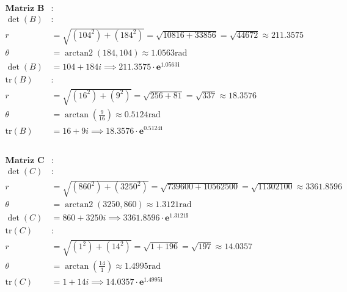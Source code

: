 \documentclass[11pt]{article}
\begin{document}
    $\displaystyle 
    \begin{aligned}
    \mathbf{\text{Matriz } B} &: \\
    \det(B) &: \\
    r &= \sqrt{(104^2) + (184^2)} = \sqrt{10816 + 33856} = \sqrt{44672} \approx 211.3575 \\
    \theta &= \operatorname{arctan2}(184,104) \approx 1.0563 \text{rad} \\
    \det(B) &= 104 + 184i \implies \mathbf{211.3575 \cdot e^{1.0563i}} \\
    \text{tr}(B) &: \\
    r &= \sqrt{(16^2) + (9^2)} = \sqrt{256 + 81} = \sqrt{337} \approx 18.3576 \\
    \theta &= \operatorname{arctan}\left(\frac{9}{16}\right) \approx 0.5124 \text{rad} \\
    \text{tr}(B) &= 16 + 9i \implies \mathbf{18.3576 \cdot e^{0.5124i}}
    \end{aligned}
    $

    
    \begin{Verbatim}[commandchars=\\\{\}]

    \end{Verbatim}

    $\displaystyle 
    \begin{aligned}
    \mathbf{\text{Matriz } C} &: \\
    \det(C) &: \\
    r &= \sqrt{(860^2) + (3250^2)} = \sqrt{739600 + 10562500} = \sqrt{11302100} \approx 3361.8596 \\
    \theta &= \operatorname{arctan2}(3250,860) \approx 1.3121 \text{rad} \\
    \det(C) &= 860 + 3250i \implies \mathbf{3361.8596 \cdot e^{1.3121i}} \\
    \text{tr}(C) &: \\
    r &= \sqrt{(1^2) + (14^2)} = \sqrt{1 + 196} = \sqrt{197} \approx 14.0357 \\
    \theta &= \operatorname{arctan}\left(\frac{14}{1}\right) \approx 1.4995 \text{rad} \\
    \text{tr}(C) &= 1 + 14i \implies \mathbf{14.0357 \cdot e^{1.4995i}}
    \end{aligned}
    $

    
    \begin{Verbatim}[commandchars=\\\{\}]

    \end{Verbatim}
\end{document}
